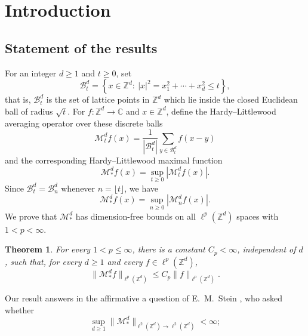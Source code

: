 \documentclass{article}
\newcommand{\Z}{\mathbb Z}
\theoremstyle{plain}
\newtheorem{theorem}{Theorem}
\numberwithin{equation}{section}
\begin{document}
\makeatletter
\let\ps@titlepage\ps@empty
\makeatother
\maketitle

\section{Introduction}

\subsection{Statement of the results}

For an integer \(d\geq 1\) and \(t\geq 0\), set
\begin{equation*}
 \mathcal B_t^d
 =\left\{x\in\mathbb Z^d:\ |x|^2=x_1^2+\cdots+x_d^2\leq t\right\},
\end{equation*}
that is, \(\mathcal B_t^d\) is the set of lattice points in $\Z^d$ which lie inside the closed Euclidean ball of radius $\sqrt{t}$.
For \(f:\mathbb Z^d\to\mathbb C\) and \(x\in\mathbb Z^d\), define the Hardy--Littlewood averaging operator over these discrete balls
\begin{equation}\label{eq:euclidean-averages}
 \mathcal M_t^df(x)
 =\frac1{|\mathcal B_t^d|}\sum_{y\in\mathcal B_t^d}f(x-y)
\end{equation}
and the corresponding Hardy--Littlewood maximal function
\begin{equation*}
 \mathcal M_*^df(x)=\sup_{t\geq 0}|\mathcal M_t^df(x)|.
\end{equation*}
Since $\mathcal B_t^d=\mathcal B_n^d$ whenever $n=\lfloor t\rfloor$, we have
\begin{equation*}
 \mathcal M_*^df(x)=\sup_{n\geq 0}|\mathcal M_n^df(x)|.
\end{equation*}
We prove that $\mathcal M_*^d$ has dimension-free bounds on all $\ell^p(\Z^d)$ spaces with $1<p<\infty$.
\begin{theorem}\label{thm:main}
For every \(1<p\leq\infty\), there is a constant \(C_p<\infty\), independent
of \(d\), such that, for every \(d\geq 1\) and every
\(f\in\ell^p(\mathbb Z^d)\),
\[
 \|\mathcal M_*^df\|_{\ell^p(\mathbb Z^d)}
 \leq C_p\|f\|_{\ell^p(\mathbb Z^d)}.
\]
\end{theorem}
\noindent Our result answers in the affirmative a question of E.~M.~Stein \cite{SteinPC}, who asked whether
\begin{equation}
\label{eq:SQ}
 \sup_{d\geq 1}
 \|\mathcal M_*^d\|_{\ell^2(\mathbb Z^d)\to\ell^2(\mathbb Z^d)}<\infty;
\end{equation}
\end{document}
